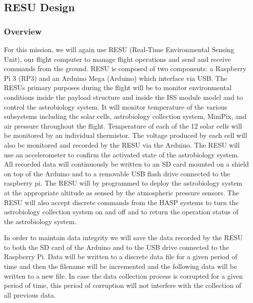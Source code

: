 \subsection{RESU Design}
\label{sec:ElectronicsDesign}

\subsubsection{Overview}

For this mission, we will again use RESU (Real-Time Environmental Sensing Unit), our flight computer to manage flight operations and send and receive commands from the ground. RESU is composed of two components: a Raspberry Pi 3 (RP3) and an Arduino Mega (Arduino) which interface via USB. The RESUs primary purposes during the flight will be to monitor environmental conditions inside the payload structure and inside the ISS module model and to control the astrobiology system. It will monitor temperature of the various subsystems including the solar cells, astrobiology collection system, MiniPix, and air pressure throughout the flight. Temperature of each of the 12 solar cells will be monitored by an individual thermistor. The voltage produced by each cell will also be monitored and recorded by the RESU via the Arduino. The RESU will use an accelerometer to confirm the activated state of the astrobiology system. All recorded data will continuously be written to an SD card mounted on a shield on top of the Arduino and to a removable USB flash drive connected to the raspberry pi. The RESU will by programmed to deploy the astrobiology system at the appropriate altitude as sensed by the atmospheric pressure sensors. The RESU will also accept discrete commands from the HASP systems to turn the astrobiology collection system on and off and to return the operation status of the astrobiology system.

\iffalse
 During our last flight we only had one mechanism for storing data with no redundancy. This means that if one of our storage devices had been damaged or corrupted during flight, all of our data would have been lost. In order to harden our payload and ensure the safety of our data we will now store redundant copies of our data. One will be stored on the SD card directly on the Arduino and the other will be transferred to the RP3 for storage.
\fi  

In order to maintain data integrity we will save the data recorded by the RESU to both the SD card of the Arduino and to the USB drive connected to the Raspberry Pi. Data will be written to a discrete data file for a given period of time and then the filename will be incremented and the following data will be written to a new file. In case the data collection process is corrupted for a given period of time, this period of corruption will not interfere with the collection of all previous data. 


